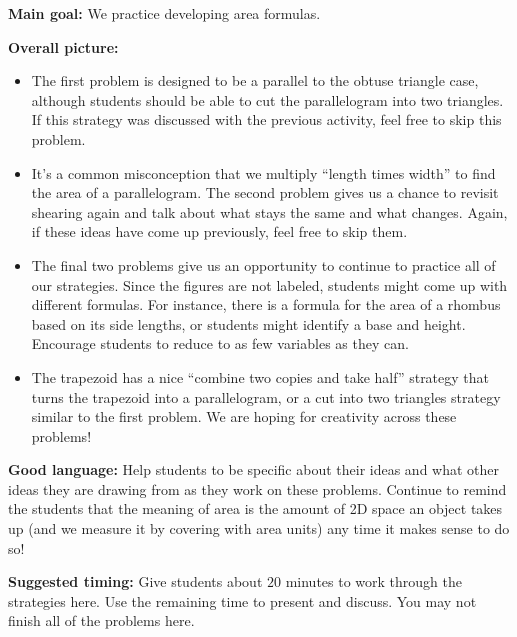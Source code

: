 \documentclass[nooutcomes,noauthor, handout]{ximera}
\begin{document}
\newpage

\begin{instructorNotes} 

{\bf Main goal:} We practice developing area formulas.

{\bf Overall picture:} 
\begin{itemize}
	\item The first problem is designed to be a parallel to the obtuse triangle case, although students should be able to cut the parallelogram into two triangles. If this strategy was discussed with the previous activity, feel free to skip this problem.
	\item It's a common misconception that we multiply ``length times width'' to find the area of a parallelogram. The second problem gives us a chance to revisit shearing again and talk about what stays the same and what changes. Again, if these ideas have come up previously, feel free to skip them.
	\item The final two problems give us an opportunity to continue to practice all of our strategies. Since the figures are not labeled, students might come up with different formulas. For instance, there is a formula for the area of a rhombus based on its side lengths, or students might identify a base and height. Encourage students to reduce to as few variables as they can.
	\item The trapezoid has a nice ``combine two copies and take half'' strategy that turns the trapezoid into a parallelogram, or a cut into two triangles strategy similar to the first problem. We are hoping for creativity across these problems!
\end{itemize}


{\bf Good language:} Help students to be specific about their ideas and what other ideas they are drawing from as they work on these problems. Continue to remind the students that the meaning of area is the amount of 2D space an object takes up (and we measure it by covering with area units) any time it makes sense to do so!



{\bf Suggested timing:} Give students about $20$ minutes to work through the strategies here. Use the remaining time to present and discuss. You may not finish all of the problems here.



\end{instructorNotes}
\end{document}

